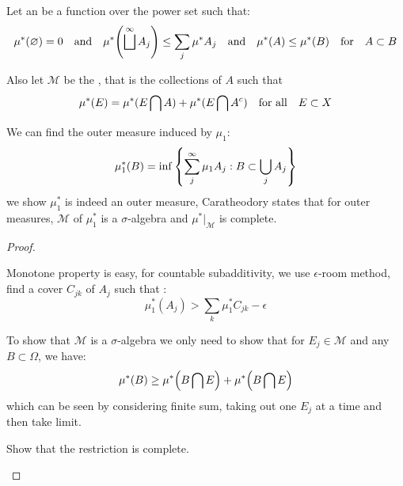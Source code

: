 Let an  be a function over the power set such that:
\begin{equation*}
    \mu^{*}(\emptyset)= 0 \qq{and} \mu^{*}\pqty{\sqcup^{\infty} A_{j}}\leq \sum_{j} \mu^{*} A_{j} \qq{and} \mu^{*}(A) \leq \mu^{*}(B)  \qq{for} A \subset B
\end{equation*}

Also let \(\mathcal{M}\) be the , that is the collections of \(A\) such that 
\begin{equation*}
    \mu^{*} (E) = \mu^{*}(E\cap A) + \mu^{*} (E\cap A^{c}) \qq{for all} E \subset X
\end{equation*}

\begin{thm}
    We can find the outer measure induced by \(\mu_{1}\): 
    \begin{equation*}
        \mu^{*}_{1}(B) = \inf\Bqty{\sum^{\infty}_{j} \mu_{1} A_{j}: B \subset \cup_{j}A_{j}}
    \end{equation*}
    we show \(\mu^{*}_{1}\) is indeed an outer measure, Caratheodory states that for outer measures, \(\mathcal{M}\) of \(\mu^{*}_{1}\) is a \(\sigma\)-algebra and \(\mu^{*}|_{\mathcal{M}}\) is complete. 
\end{thm}
\begin{proof}
    \begin{summary}[1]
        Monotone property is easy, for countable subadditivity, we use \(\epsilon\)-room method, find a cover \(C_{jk}\) of \(A_{j}\) such that :
        \begin{equation*}
            \mu^{*}_{1}(A_{j}) > \sum_{k} \mu^{*}_{1}C_{jk} - \epsilon
        \end{equation*}
    \end{summary}
    \begin{summary}[2]
        To show that \(\mathcal{M}\) is a \(\sigma\)-algebra we only need to show that for \(E_{j} \in \mathcal{M}\) and any \(B \subset \Omega\), we have:
        \begin{equation*}
            \mu^{*} (B ) \geq \mu^{*} \pqty{B \cap E} + \mu^{*} \pqty{B \cap E}
        \end{equation*}
        which can be seen by considering finite sum, taking out one \(E_{j}\) at a time and then take limit. 
    \end{summary}
    \begin{summary}[3]
        Show that the restriction is complete.
    \end{summary}
\end{proof}

